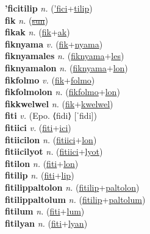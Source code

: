 \textbf{'ficitilip} \textit{n.} (\hyperref['fici]{'fici}+\hyperref[tilip]{tilip})
 \label{'ficitilip} \\
\textbf{fik} \textit{n.} (\hyperref[sun]{\sout{sun}})
 \label{fik} \\
\textbf{fikak} \textit{n.} (\hyperref[fik]{fik}+\hyperref[ak]{ak})
 \label{fikak} \\
\textbf{fiknyama} \textit{v.} (\hyperref[fik]{fik}+\hyperref[nyama]{nyama})
 \label{fiknyama} \\
\textbf{fiknyamales} \textit{n.} (\hyperref[fiknyama]{fiknyama}+\hyperref[les]{les})
 \label{fiknyamales} \\
\textbf{fiknyamalon} \textit{n.} (\hyperref[fiknyama]{fiknyama}+\hyperref[lon]{lon})
 \label{fiknyamalon} \\
\textbf{fikfolmo} \textit{v.} (\hyperref[fik]{fik}+\hyperref[folmo]{folmo})
 \label{fikfolmo} \\
\textbf{fikfolmolon} \textit{n.} (\hyperref[fikfolmo]{fikfolmo}+\hyperref[lon]{lon})
 \label{fikfolmolon} \\
\textbf{fikkwelwel} \textit{n.} (\hyperref[fik]{fik}+\hyperref[kwelwel]{kwelwel})
 \label{fikkwelwel} \\
\textbf{fiti} \textit{v.} (Epo. ⟨fidi⟩ [ˈfidi])
 \label{fiti} \\
\textbf{fitiici} \textit{v.} (\hyperref[fiti]{fiti}+\hyperref[ici]{ici})
 \label{fitiici} \\
\textbf{fitiicilon} \textit{n.} (\hyperref[fitiici]{fitiici}+\hyperref[lon]{lon})
 \label{fitiicilon} \\
\textbf{fitiicilyot} \textit{n.} (\hyperref[fitiici]{fitiici}+\hyperref[lyot]{lyot})
 \label{fitiicilyot} \\
\textbf{fitilon} \textit{n.} (\hyperref[fiti]{fiti}+\hyperref[lon]{lon})
 \label{fitilon} \\
\textbf{fitilip} \textit{n.} (\hyperref[fiti]{fiti}+\hyperref[lip]{lip})
 \label{fitilip} \\
\textbf{fitilippaltolon} \textit{n.} (\hyperref[fitilip]{fitilip}+\hyperref[paltolon]{paltolon})
 \label{fitilippaltolon} \\
\textbf{fitilippaltolum} \textit{n.} (\hyperref[fitilip]{fitilip}+\hyperref[paltolum]{paltolum})
 \label{fitilippaltolum} \\
\textbf{fitilum} \textit{n.} (\hyperref[fiti]{fiti}+\hyperref[lum]{lum})
 \label{fitilum} \\
\textbf{fitilyan} \textit{n.} (\hyperref[fiti]{fiti}+\hyperref[lyan]{lyan})
 \label{fitilyan} \\
